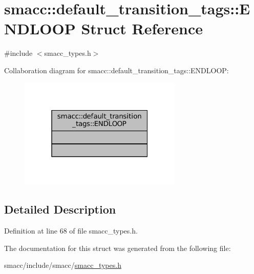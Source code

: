 \hypertarget{structsmacc_1_1default__transition__tags_1_1ENDLOOP}{}\section{smacc\+:\+:default\+\_\+transition\+\_\+tags\+:\+:E\+N\+D\+L\+O\+OP Struct Reference}
\label{structsmacc_1_1default__transition__tags_1_1ENDLOOP}


{\ttfamily \#include $<$smacc\+\_\+types.\+h$>$}



Collaboration diagram for smacc\+:\+:default\+\_\+transition\+\_\+tags\+:\+:E\+N\+D\+L\+O\+OP\+:
\nopagebreak
\begin{figure}[H]
\begin{center}
\leavevmode
\includegraphics[width=220pt]{structsmacc_1_1default__transition__tags_1_1ENDLOOP__coll__graph}
\end{center}
\end{figure}


\subsection{Detailed Description}


Definition at line 68 of file smacc\+\_\+types.\+h.



The documentation for this struct was generated from the following file\+:\begin{DoxyCompactItemize}
\item 
smacc/include/smacc/\hyperlink{smacc__types_8h}{smacc\+\_\+types.\+h}\end{DoxyCompactItemize}
